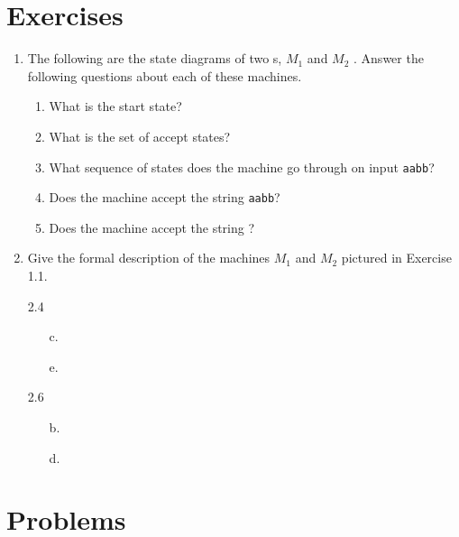 \section*{Exercises}

\begin{enumerate}[font=\bfseries]

    \item The following are the state diagrams of two \dfa s, $M_1$ and $M_2$ . Answer the following questions about each of these machines.
    
    \begin{enumerate}[font=\bfseries,label=\alph*.]
        \item What is the start state?
        \item What is the set of accept states?
        \item What sequence of states does the machine go through on input {\tt aabb}?
        \item Does the machine accept the string {\tt aabb}?
        \item Does the machine accept the string \emptystring?
    \end{enumerate}
    
    \item Give the formal description of the machines $M_1$ and $M_2$ pictured in Exercise 1.1.
    
    \item[2.4]
    \begin{enumerate}[font=\bfseries]
        \item[c.]
        \item[e.]
    \end{enumerate}
    
    \item[2.6]
    \begin{enumerate}[font=\bfseries]
        \item[b.]
        \item[d.]
    \end{enumerate}

\end{enumerate}

\section*{Problems}

